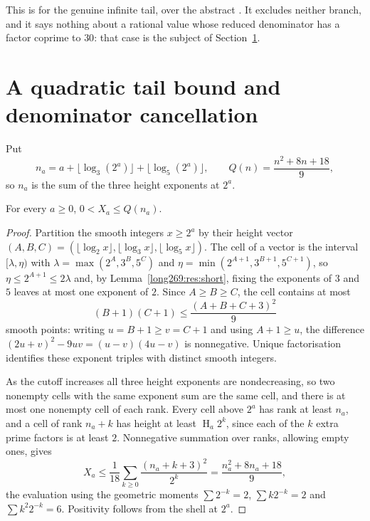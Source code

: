 \documentclass[11pt]{article}
\newcommand{\hgt}{\operatorname{H}}
\newcommand{\lo}{\lambda}
\newcommand{\hi}{\eta}
\begin{document}
\noindent This is
for the genuine infinite tail, over the abstract
.  It excludes neither branch, and it says
nothing about a rational value whose reduced denominator has a factor coprime
to $30$: that case is the subject of Section~\ref{long269:sec:actual-orbit}.

\section{A quadratic tail bound and denominator cancellation}
\label{long269:sec:actual-orbit}

Put
\[
 n_a=a+\lfloor\log_3(2^{a})\rfloor+\lfloor\log_5(2^{a})\rfloor,
 \qquad
 Q(n)=\frac{n^{2}+8n+18}{9},
\]
so $n_a$ is the sum of the three height exponents at $2^{a}$.

\begin{theorem}\label{long269:res:actual-tail-bound}
For every $a\ge0$, $0<X_a\le Q(n_a)$.
\end{theorem}

\begin{proof}
Partition the smooth integers $x\ge2^{a}$ by their height vector
$(A,B,C)=(\lfloor\log_2x\rfloor,\lfloor\log_3x\rfloor,\lfloor\log_5x\rfloor)$.
The cell of a vector is the interval $[\lo,\hi)$ with
$\lo=\max(2^{A},3^{B},5^{C})$ and $\hi=\min(2^{A+1},3^{B+1},5^{C+1})$, so
$\hi\le2^{A+1}\le2\lo$ and, by Lemma~\ref{long269:res:short}, fixing the exponents of
$3$ and $5$ leaves at most one exponent of $2$.  Since $A\ge B\ge C$, the cell
contains at most
\[
 (B+1)(C+1)\le\frac{(A+B+C+3)^{2}}{9}
\]
smooth points: writing $u=B+1\ge v=C+1$ and using $A+1\ge u$, the difference
$(2u+v)^{2}-9uv=(u-v)(4u-v)$ is nonnegative.  Unique factorisation identifies
these exponent triples with distinct smooth integers.

As the cutoff increases all three height exponents are nondecreasing, so two
nonempty cells with the same exponent sum are the same cell, and there is at
most one nonempty cell of each rank.  Every cell above $2^{a}$ has rank at
least $n_a$, and a cell of rank $n_a+k$ has height at least $\hgt_a2^{k}$,
since each of the $k$ extra prime factors is at least $2$.  Nonnegative
summation over ranks, allowing empty ones, gives
\[
 X_a\le\frac1{18}\sum_{k\ge0}\frac{(n_a+k+3)^{2}}{2^{k}}
      =\frac{n_a^{2}+8n_a+18}{9},
\]
the evaluation using the geometric moments $\sum2^{-k}=2$, $\sum k2^{-k}=2$
and $\sum k^{2}2^{-k}=6$.  Positivity follows from the shell at $2^{a}$.
\end{proof}
\end{document}
